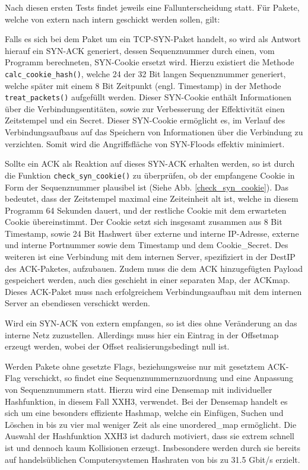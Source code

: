 \documentclass[../review_3.tex]{subfiles}
\begin{document}
Nach diesen ersten Tests findet jeweils eine Fallunterscheidung statt. Für Pakete, welche von extern nach intern geschickt werden sollen, gilt:

Falls es sich bei dem Paket um ein TCP-SYN-Paket handelt, so wird als Antwort hierauf ein SYN-ACK generiert, dessen Sequenznummer durch einen, vom Programm berechneten, SYN-Cookie ersetzt wird. Hierzu existiert die Methode \texttt{calc\_cookie\_hash()}, welche 24 der 32 Bit langen Sequenznummer generiert, welche später mit einem 8 Bit Zeitpunkt (engl. \glqq Timestamp\grqq) in der Methode \texttt{treat\_packets()} aufgefüllt werden. Dieser SYN-Cookie enthält Informationen über die Verbindungsentitäten, sowie zur Verbesserung der Effektivität einen Zeitstempel und ein Secret. Dieser SYN-Cookie ermöglicht es, im Verlauf des Verbindungsaufbaus auf das Speichern von Informationen über die Verbindung zu verzichten. Somit wird die Angriffsfläche von SYN-Floods effektiv minimiert.

Sollte ein ACK als Reaktion auf dieses SYN-ACK erhalten werden, so ist durch die Funktion \texttt{check\_syn\_cookie()} zu überprüfen, ob der empfangene Cookie in Form der Sequenznummer plausibel ist (Siehe Abb. \ref{check_syn_cookie}). Das bedeutet, dass der Zeitstempel maximal eine Zeiteinheit alt ist, welche in diesem Programm 64 Sekunden dauert, und der restliche Cookie mit dem erwarteten Cookie übereinstimmt. Der Cookie setzt sich insgesamt zusammen aus 8 Bit Timestamp, sowie 24 Bit Hashwert über externe und interne IP-Adresse, externe und interne Portnummer sowie dem Timestamp und dem Cookie\_Secret.
Des weiteren ist eine Verbindung mit dem internen Server, spezifiziert in der DestIP des ACK-Paketes, aufzubauen. Zudem muss die dem ACK hinzugefügten Payload gespeichert werden, auch dies geschieht in einer separaten Map, der ACKmap. Dieses ACK-Paket muss nach erfolgreichem Verbindungsaufbau mit dem internen Server an ebendiesen verschickt werden.

Wird ein SYN-ACK von extern empfangen, so ist dies ohne Veränderung an das interne Netz zuzustellen. Allerdings muss hier ein Eintrag in der Offsetmap erzeugt werden, wobei der Offset realisierungsbedingt null ist.

Werden Pakete ohne gesetzte Flags, beziehungsweise nur mit gesetztem ACK-Flag verschickt, so findet eine Sequenznummernzuordnung und eine Anpassung von Sequenznummern statt. Hierzu wird eine Densemap mit individueller Hashfunktion, in diesem Fall XXH3, verwendet. Bei der Densemap handelt es sich um eine besonders effiziente Hashmap, welche ein Einfügen, Suchen und Löschen in bis zu vier mal weniger Zeit als eine unordered\_map ermöglicht. Die Auswahl der Hashfunktion XXH3 ist  dadurch motiviert, dass sie extrem schnell ist und dennoch kaum Kollisionen erzeugt. Insbesondere werden durch sie bereits auf handelsüblichen Computersystemen Hashraten von bis zu 31.5 Gbit/s erzielt.
\end{document}
